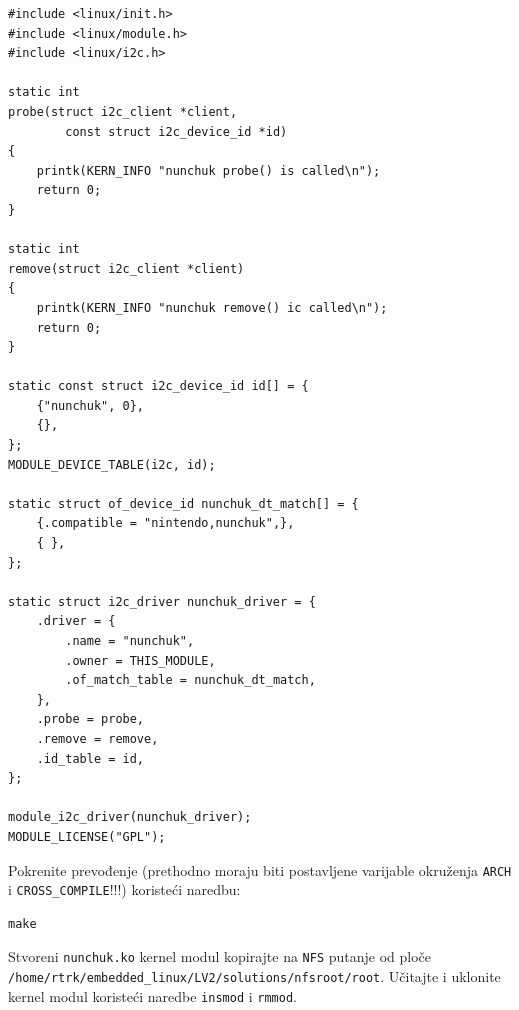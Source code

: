 \documentclass[11pt]{article}
\begin{document}
\begin{lstlisting}[style=CStyle]
#include <linux/init.h>
#include <linux/module.h>
#include <linux/i2c.h>

static int
probe(struct i2c_client *client,
		const struct i2c_device_id *id)
{
	printk(KERN_INFO "nunchuk probe() is called\n");
	return 0;
}

static int
remove(struct i2c_client *client)
{
	printk(KERN_INFO "nunchuk remove() ic called\n");
	return 0;
}

static const struct i2c_device_id id[] = {
	{"nunchuk", 0},
	{},
};
MODULE_DEVICE_TABLE(i2c, id);

static struct of_device_id nunchuk_dt_match[] = {
	{.compatible = "nintendo,nunchuk",},
	{ },
};

static struct i2c_driver nunchuk_driver = {
	.driver = {
		.name = "nunchuk",
		.owner = THIS_MODULE,
		.of_match_table = nunchuk_dt_match,
	},
	.probe = probe,
	.remove = remove,
	.id_table = id,
};

module_i2c_driver(nunchuk_driver);
MODULE_LICENSE("GPL");
\end{lstlisting}

Pokrenite prevođenje (prethodno moraju biti postavljene varijable okruženja
\texttt{ARCH} i \texttt{CROSS\_COMPILE}!!!) koristeći naredbu:
\begin{lstlisting}
make
\end{lstlisting}

\noindent Stvoreni \texttt{nunchuk.ko} kernel modul kopirajte na \texttt{NFS} putanje
od ploče \texttt{/home/rtrk/embedded\_linux/LV2/solutions/nfsroot/root}.
Učitajte i uklonite kernel modul koristeći naredbe \texttt{insmod} i \texttt{rmmod}.
\end{document}

